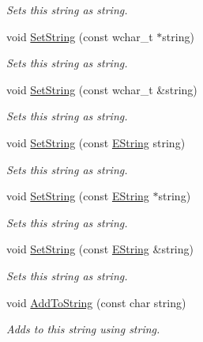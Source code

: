 \begin{DoxyCompactItemize}
\begin{DoxyCompactList}\small\item\em Sets this string as string. \end{DoxyCompactList}\item 
void \hyperlink{class_triton_1_1_util_1_1_e_string_a72fc9c5e75e529ce2eaa702100c27c56}{Set\+String} (const wchar\+\_\+t $\ast$string)
\begin{DoxyCompactList}\small\item\em Sets this string as string. \end{DoxyCompactList}\item 
void \hyperlink{class_triton_1_1_util_1_1_e_string_aa1b35991fb415d20bbc6c9b6dd6b2971}{Set\+String} (const wchar\+\_\+t \&string)
\begin{DoxyCompactList}\small\item\em Sets this string as string. \end{DoxyCompactList}\item 
void \hyperlink{class_triton_1_1_util_1_1_e_string_ad094e99a9e3dc2b63a76f5d62b0910c9}{Set\+String} (const \hyperlink{class_triton_1_1_util_1_1_e_string}{E\+String} string)
\begin{DoxyCompactList}\small\item\em Sets this string as string. \end{DoxyCompactList}\item 
void \hyperlink{class_triton_1_1_util_1_1_e_string_a3b95496cbd71240cbdbbe7c489195e7f}{Set\+String} (const \hyperlink{class_triton_1_1_util_1_1_e_string}{E\+String} $\ast$string)
\begin{DoxyCompactList}\small\item\em Sets this string as string. \end{DoxyCompactList}\item 
void \hyperlink{class_triton_1_1_util_1_1_e_string_a9b693497ca0b33606ad29ab6f1403bab}{Set\+String} (const \hyperlink{class_triton_1_1_util_1_1_e_string}{E\+String} \&string)
\begin{DoxyCompactList}\small\item\em Sets this string as string. \end{DoxyCompactList}\item 
void \hyperlink{class_triton_1_1_util_1_1_e_string_a840d02acb2eb94c35dff6ad03caa3759}{Add\+To\+String} (const char string)
\begin{DoxyCompactList}\small\item\em Adds to this string using string. \end{DoxyCompactList}\item 

\end{DoxyCompactItemize}
